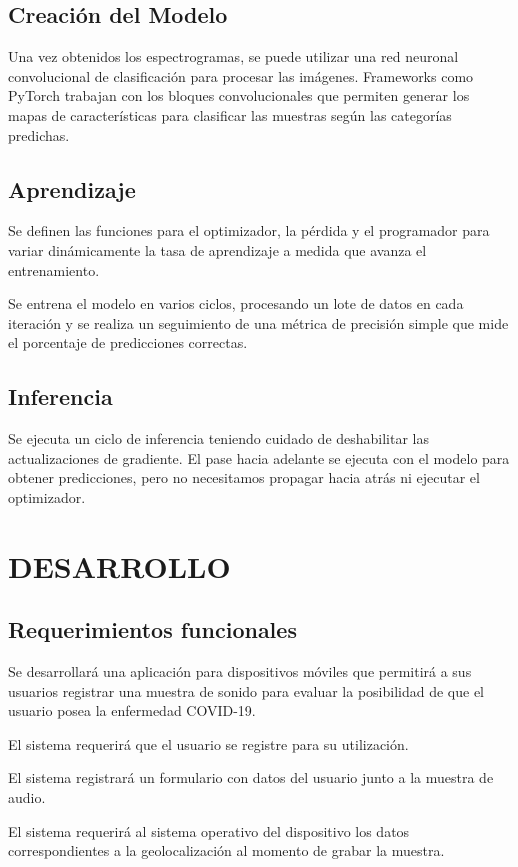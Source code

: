 \documentclass[journal]{IEEEtran}
\begin{document}
\subsection{Creación del Modelo}
Una vez obtenidos los espectrogramas, se puede utilizar una red neuronal convolucional de clasificación para procesar las imágenes. Frameworks como PyTorch trabajan con los bloques convolucionales que permiten generar los mapas de características para clasificar las muestras según las categorías predichas\cite{tp}.

\subsection{Aprendizaje}
Se definen las funciones para el optimizador, la pérdida y el programador para variar dinámicamente la tasa de aprendizaje a medida que avanza el entrenamiento.


Se entrena el modelo en varios ciclos, procesando un lote de datos en cada iteración y se realiza un seguimiento de una métrica de precisión simple que mide el porcentaje de predicciones correctas\cite{tp}.

\subsection{Inferencia}
Se ejecuta un ciclo de inferencia teniendo cuidado de deshabilitar las actualizaciones de gradiente. El pase hacia adelante se ejecuta con el modelo para obtener predicciones, pero no necesitamos propagar hacia atrás ni ejecutar el optimizador\cite{tp}.

\section{DESARROLLO}
\subsection{Requerimientos funcionales}
Se desarrollará una aplicación para dispositivos móviles que permitirá a sus usuarios registrar una muestra de sonido para evaluar la posibilidad de que el usuario posea la enfermedad COVID-19.

El sistema requerirá que el usuario se registre para su utilización.

El sistema registrará un formulario con datos del usuario junto a la muestra de audio.

El sistema requerirá al sistema operativo del dispositivo los datos correspondientes a la geolocalización al momento de grabar la muestra.
\end{document}
